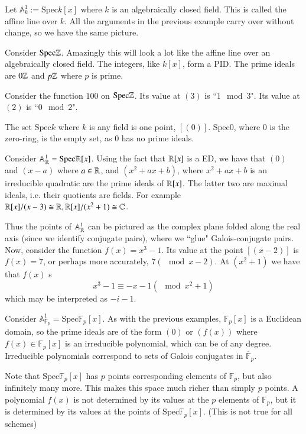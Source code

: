\begin{example}
    Let $\mathbb{A}_{k}^1 := \text{Spec}k[x]$ where $k$ is an algebraically closed field. This is called the affine line over $k$. All the arguments in the previous example carry over without change, so we have the same picture.
\end{example}

\begin{example}
    Consider $\text{Spec}\mathbb Z$. Amazingly this will look a lot like the affine line over an algebraically closed field. The integers, like $\overline{k}[x]$, form a PID. The prime ideals are $0\mathbb Z$ and $p\mathbb Z$ where $p$ is prime. 

    Consider the function $100$ on $\text{Spec}\mathbb Z$. Its value at $(3)$ is ``$1\mod 3$". Its value at $(2)$ is ``$0\mod 2$".
\end{example}

\begin{example}
    The set $\text{Spec}k$ where $k$ is any field is one point, $[(0)]$. $\text{Spec}0$, where $0$ is the zero-ring, is the empty set, as $0$ has no prime ideals.
\end{example}


\begin{example}
    Consider $\mathbb{A}_{\mathbb R}^1 = \text{Spec}\mathbb R[x]$. Using the fact that $\mathbb R[x]$ is a ED, we have that $(0)$ and $(x-a)$ where $a \in \mathbb R$, and $(x^2+ax+b)$, where $x^2+ax+b$ is an irreducible quadratic are the prime ideals of $\mathbb R[x]$. The latter two are maximal ideals, i.e. their quotients are fields. For example $\mathbb R[x]/(x-3) \cong \mathbb R, \mathbb R[x]/(x^2+1)\cong \mathbb C$.

    Thus the points of $\mathbb{A}_{\mathbb R}^1$ can be pictured as the complex plane folded along the real axis (since we identify conjugate pairs), where we ``glue" Galois-conjugate pairs. Now, consider the function $f(x) = x^3-1$. Its value at the point $[(x-2)]$ is $f(x) = 7$, or perhaps more accurately, $7 (\mod x-2)$. At $(x^2+1)$ we have that $f(x)$ s \begin{equation*}
        x^3-1 \equiv -x-1(\mod x^2+1)
    \end{equation*}
    which may be interpreted as $-i-1$.
\end{example}


\begin{example}
    Consider $\mathbb{A}_{\mathbb{F}_p}^1 = \text{Spec}\mathbb{F}_p[x]$. As with the previous examples, $\mathbb{F}_p[x]$ is a Euclidean domain, so the prime ideals are of the form $(0)$ or $(f(x))$ where $f(x) \in \mathbb{F}_p[x]$ is an irreducible polynomial, which can be of any degree. Irreducible polynomials correspond to sets of Galois conjugates in $\overline{\mathbb{F}}_p$.

    Note that $\text{Spec}\mathbb{F}_p[x]$ has $p$ points corresponding elements of $\mathbb{F}_p$, but also infinitely many more. This makes this space much richer than simply $p$ points. A polynomial $f(x)$ is not determined by its values at the $p$ elements of $\mathbb{F}_p$, but it is determined by its values at the points of $\text{Spec}\mathbb{F}_p[x]$. (This is not true for all schemes)
\end{example}


